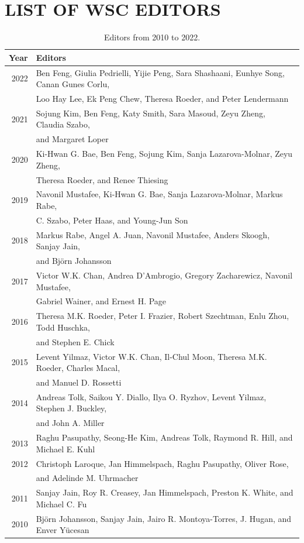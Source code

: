 \documentclass{wscpaperproc}
\theoremstyle{wsc}
\begin{document}
\section*{LIST OF WSC EDITORS}
\begin{table}[htb]
\centering
\caption{Editors from 2010 to 2022.\label{tab: third}}
\begin{tabular}{|r|l|}
\hline
Year & Editors\\ \hline
2022 & Ben Feng, Giulia Pedrielli, Yijie Peng, Sara Shashaani, Eunhye Song, Canan Gunes Corlu,\\&Loo Hay Lee, Ek Peng Chew, Theresa Roeder, and Peter Lendermann\\ \hline
2021 & Sojung Kim, Ben Feng, Katy Smith, Sara Masoud, Zeyu Zheng, Claudia Szabo,\\
& and Margaret Loper\\ \hline
2020 & Ki-Hwan G. Bae, Ben Feng, Sojung Kim, Sanja Lazarova-Molnar, Zeyu Zheng,\\ 
 & Theresa Roeder, and Renee Thiesing\\ \hline
2019 & Navonil Mustafee, Ki-Hwan G. Bae, Sanja Lazarova-Molnar, Markus Rabe, \\ 
 & C. Szabo, Peter Haas, and Young-Jun Son\\ \hline
2018 & Markus Rabe, Angel A. Juan, Navonil Mustafee, Anders Skoogh, Sanjay Jain,\\
 & and Björn Johansson\\ \hline
2017 & Victor W.K. Chan, Andrea D’Ambrogio, Gregory Zacharewicz, Navonil Mustafee,\\
 & Gabriel Wainer, and Ernest H. Page\\ \hline
2016 & Theresa M.K. Roeder, Peter I. Frazier, Robert Szechtman, Enlu Zhou, Todd Huschka,\\
 & and Stephen E. Chick\\ \hline
2015 & Levent Yilmaz, Victor W.K. Chan, Il-Chul Moon, Theresa M.K. Roeder, Charles Macal, \\
 & and Manuel D. Rossetti\\ \hline
2014 & Andreas Tolk, Saikou Y. Diallo, Ilya O. Ryzhov, Levent Yilmaz, Stephen J. Buckley, \\
 & and John A. Miller\\ \hline
2013 & Raghu Pasupathy, Seong-He Kim, Andreas Tolk, Raymond R. Hill, and Michael E. Kuhl\\ \hline
2012 & Christoph Laroque, Jan Himmelspach, Raghu Pasupathy, Oliver Rose, \\
 & and Adelinde M. Uhrmacher\\ \hline
2011 & Sanjay Jain, Roy R. Creasey, Jan Himmelspach, Preston K. White, and Michael C. Fu\\ \hline
2010 & Björn Johansson, Sanjay Jain, Jairo R. Montoya-Torres, J. Hugan, and Enver Yücesan\\
\hline
\end{tabular}
\end{table}
\end{document}
